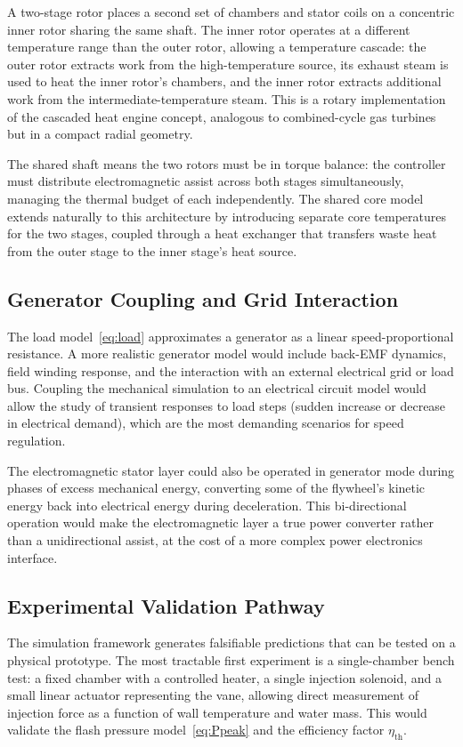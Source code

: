 \documentclass[11pt, a4paper]{article}
\theoremstyle{plain}
\theoremstyle{definition}
\begin{document}
A two-stage rotor places a second set of chambers and stator coils on a concentric inner rotor sharing the same shaft. The inner rotor operates at a different temperature range than the outer rotor, allowing a temperature cascade: the outer rotor extracts work from the high-temperature source, its exhaust steam is used to heat the inner rotor's chambers, and the inner rotor extracts additional work from the intermediate-temperature steam. This is a rotary implementation of the cascaded heat engine concept, analogous to combined-cycle gas turbines but in a compact radial geometry.

The shared shaft means the two rotors must be in torque balance: the controller must distribute electromagnetic assist across both stages simultaneously, managing the thermal budget of each independently. The shared core model extends naturally to this architecture by introducing separate core temperatures for the two stages, coupled through a heat exchanger that transfers waste heat from the outer stage to the inner stage's heat source.

\subsection{Generator Coupling and Grid Interaction}

The load model~\eqref{eq:load} approximates a generator as a linear speed-proportional resistance. A more realistic generator model would include back-EMF dynamics, field winding response, and the interaction with an external electrical grid or load bus. Coupling the mechanical simulation to an electrical circuit model would allow the study of transient responses to load steps (sudden increase or decrease in electrical demand), which are the most demanding scenarios for speed regulation.

The electromagnetic stator layer could also be operated in generator mode during phases of excess mechanical energy, converting some of the flywheel's kinetic energy back into electrical energy during deceleration. This bi-directional operation would make the electromagnetic layer a true power converter rather than a unidirectional assist, at the cost of a more complex power electronics interface.

\subsection{Experimental Validation Pathway}

The simulation framework generates falsifiable predictions that can be tested on a physical prototype. The most tractable first experiment is a single-chamber bench test: a fixed chamber with a controlled heater, a single injection solenoid, and a small linear actuator representing the vane, allowing direct measurement of injection force as a function of wall temperature and water mass. This would validate the flash pressure model~\eqref{eq:Ppeak} and the efficiency factor $\eta_{\mathrm{th}}$.
\end{document}
